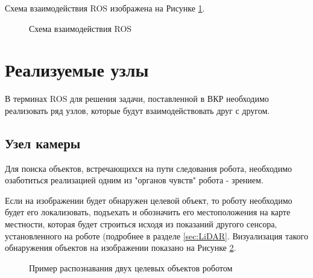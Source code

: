 \documentclass[12pt,a4paper]{scrartcl}
\begin{document}
				Схема взаимодействия ROS изображена на Рисунке \ref{fig:ROSScheme}\cite{bib:RosScheme}.
				
				\begin{figure}[h]
					\caption{Схема взаимодействия ROS}
					\label{fig:ROSScheme}
				\end{figure}
				
		\section{Реализуемые узлы}
			В терминах ROS для решения задачи, поставленной в ВКР необходимо реализовать ряд узлов, которые будут взаимодействовать друг с другом.
			
			\subsection{Узел камеры}
			 	Для поиска объектов, встречающихся на пути следования робота, необходимо озаботиться реализацией одним из "органов чувств" робота - зрением. 
				
				Если на изображении будет обнаружен целевой объект, то роботу необходимо будет его локализовать, подъехать и обозначить его местоположения на карте местности, которая будет строиться исходя из показаний другого сенсора, установленного на роботе (подробнее в разделе \ref{sec:LiDAR}. Визуализация такого обнаружения объектов на изображении показано на Рисунке \ref{fig:ObjectDetectionExample}.
				
				\begin{figure}[h]
					\caption{Пример распознавания двух целевых объектов роботом}
					\label{fig:ObjectDetectionExample}
				\end{figure}
							 
\end{document}
